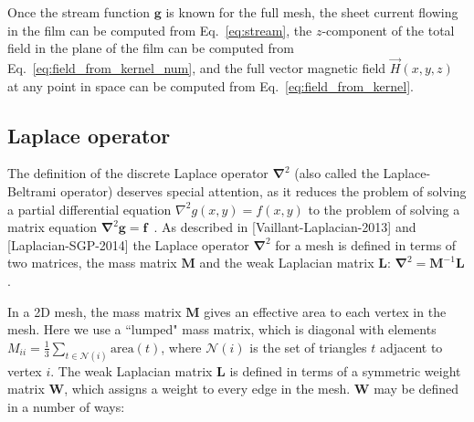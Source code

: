 \documentclass[preprint,12pt]{elsarticle}
\newcounter{bla}
\begin{document}
Once the stream function $\mathbf{g}$ is known for the full mesh,
the sheet current flowing in the film can be computed from Eq.~\ref{eq:stream}, the $z$-component of the total field in the plane of the film can be computed
from Eq.~\ref{eq:field_from_kernel_num}, and the full vector magnetic field $\vec{H}(x, y, z)$
at any point in space can be computed from Eq.~\ref{eq:field_from_kernel}.

\subsection{Laplace operator}
\label{section:implementation:laplace}

The definition of the discrete Laplace operator $\mathbf{\nabla}^2$ (also called the Laplace-Beltrami operator) deserves special attention, as it reduces the problem of solving a partial differential equation $\nabla^2g(x,y)=f(x,y)$ to the problem of solving a matrix equation
$\mathbf{\nabla}^2\mathbf{g}=\mathbf{f}$~\cite{Reuter_Biasotti_Giorgi_Patane_Spagnuolo_2009}. As described in [Vaillant-Laplacian-2013] and [Laplacian-SGP-2014] the Laplace operator $\mathbf{\nabla}^2$ for a mesh is defined in terms of two matrices, the mass matrix $\mathbf{M}$ and the
weak Laplacian matrix $\mathbf{L}$: $\mathbf{\nabla}^2 = \mathbf{M}^{-1}\mathbf{L}$.


In a 2D mesh, the mass matrix $\mathbf{M}$ gives an effective area to each vertex in the mesh. Here we use a ``lumped" mass matrix, which is diagonal with elements $M_{ii} = \frac{1}{3}\sum_{t\in\mathcal{N}(i)}\mathrm{area}(t)$,
where $\mathcal{N}(i)$ is the set of triangles $t$ adjacent to vertex $i$. The weak Laplacian matrix $\mathbf{L}$ is defined in terms of a symmetric weight matrix $\mathbf{W}$, which assigns a weight to every edge in the mesh. $\mathbf{W}$ may be defined in a number of ways:
\end{document}
